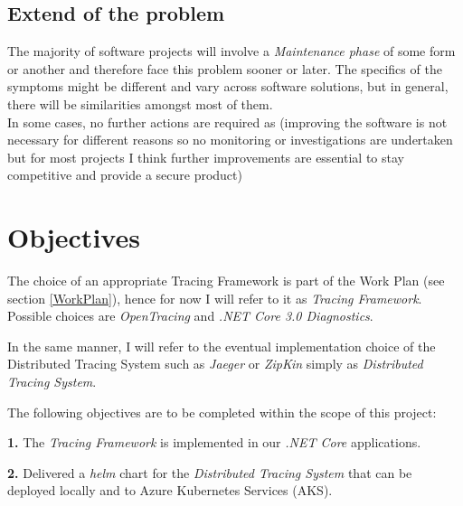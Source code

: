 \documentclass[11pt]{article}
\begin{document}

\subsection{Extend of the problem}

The majority of software projects will involve a \textit{Maintenance phase} of some form or another and therefore face this problem sooner or later. The specifics of the symptoms might be different and vary across software solutions, but in general, there will be similarities amongst most of them.\\
In some cases, no further actions are required as (improving the software is not necessary for different reasons so no monitoring or investigations are undertaken but for most projects I think further improvements are essential to stay competitive and provide a secure product)

\section{Objectives} 


The choice of an appropriate Tracing Framework is part of the Work Plan (see section \ref{WorkPlan}), hence for now I will refer to it as \textit{Tracing Framework}. Possible choices are \textit{OpenTracing} and \textit{.NET Core 3.0 Diagnostics}.

In the same manner, I will refer to the eventual implementation choice of the Distributed Tracing System such as \textit{Jaeger} or \textit{ZipKin} simply as \textit{Distributed Tracing System}.

The following objectives are to be completed within the scope of this project:

\textbf{1.} The \textit{Tracing Framework} is implemented in our \textit{.NET Core} applications.


\textbf{2.} Delivered a \textit{helm} chart for the \textit{Distributed Tracing System} that can be deployed locally and to Azure Kubernetes Services (AKS).
\end{document}
